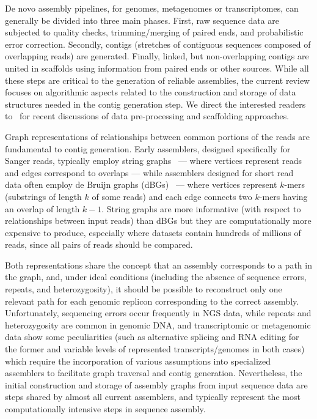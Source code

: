 \documentclass[11pt,oneside,a4paper]{article}
\begin{document}
De novo assembly pipelines, for genomes, metagenomes or transcriptomes, can
generally be divided into three main phases.
%
First, raw sequence data are subjected to quality checks, trimming/merging of
paired ends, and probabilistic error correction.
%
Secondly, contigs (stretches of contiguous sequences composed of overlapping
reads) are generated.
%
Finally, linked, but non-overlapping contigs are united in scaffolds using
information from paired ends or other sources.
%
While all these steps are critical to the generation of reliable assemblies,
the current review focuses on algorithmic aspects related to the construction
and storage of data structures needed in the contig generation step.
%
We direct the interested readers
to~\cite{Yang2013, Laehnemann2016, Hunt2014} for recent discussions of data
pre-processing and scaffolding approaches. 

Graph representations of relationships between common portions of the reads
are fundamental to contig generation.
%
Early assemblers, designed specifically for Sanger reads, typically employ string
graphs~\cite{Myers2005} --- where vertices represent reads and edges correspond
to overlaps --- while assemblers designed for short read data often employ
de Bruijn graphs (dBGs)~\cite{compeau2011} --- where vertices represent $k$-mers
(substrings of length $k$ of some reads) and each edge connects two $k$-mers
having an overlap of length $k-1$.
%
String graphs are more informative (with respect to relationships between input
reads) than dBGs but they are computationally more expensive to produce,
especially where datasets contain hundreds of millions of reads, since all
pairs of reads should be compared.

Both representations share the concept that an assembly corresponds to a path
in the graph, and, under ideal conditions (including the absence of sequence
errors, repeats, and heterozygosity), it should be possible to reconstruct only
one relevant path for each genomic replicon corresponding to the correct assembly.
%
Unfortunately, sequencing errors occur frequently in NGS data, while repeats and
heterozygosity are common in genomic DNA, and transcriptomic or metagenomic data
show some peculiarities (such as alternative splicing and RNA editing for the
former and variable levels of represented transcripts/genomes in both cases)
which require the incorporation of various assumptions into specialized assemblers
to facilitate graph traversal and contig generation.
%
Nevertheless, the initial construction and storage of assembly graphs from input
sequence data are steps shared by almost all current assemblers, and typically
represent the most computationally intensive steps in sequence assembly.
\end{document}

